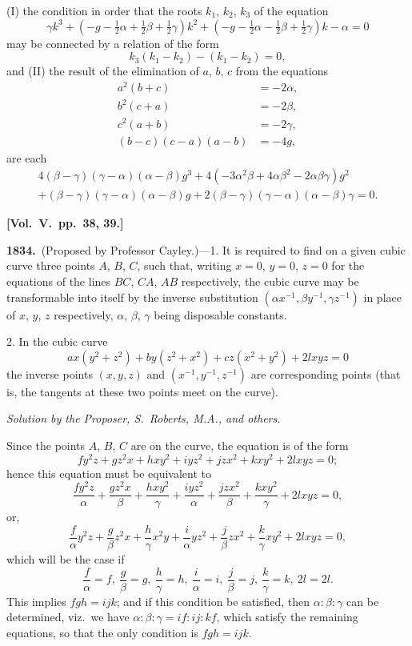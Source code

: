 \documentclass[11pt,a4paper]{article}
\theoremstyle{plain}
\theoremstyle{definition}
\theoremstyle{remark}
\begin{document}
(I) the condition in order that the roots $k_{1}$, $k_{2}$, $k_{3}$ of the equation
\[
\gamma k^{3}+(-g-\tfrac12\alpha+\tfrac12\beta+\tfrac12\gamma)k^{2}+(-g-\tfrac12\alpha-\tfrac12\beta+\tfrac12\gamma)k-\alpha=0 \tag{A}
\]
may be connected by a relation of the form
\[
k_{3}(k_{1}-k_{2})-(k_{1}-k_{2})=0, \tag{1}
\]
and (II) the result of the elimination of $a$, $b$, $c$ from the equations
\begin{align*}
a^{2}(b+c) &= -2\alpha, \tag{2}\\
b^{2}(c+a) &= -2\beta, \tag{3}\\
c^{2}(a+b) &= -2\gamma, \tag{4}\\
(b-c)(c-a)(a-b) &= -4g, \tag{5}
\end{align*}
are each
\begin{multline*}
4(\beta-\gamma)(\gamma-\alpha)(\alpha-\beta)g^{3} + 4(-3\alpha^{2}\beta+4\alpha\beta^{2}-2\alpha\beta\gamma)g^{2}\\
+ (\beta-\gamma)(\gamma-\alpha)(\alpha-\beta)g + 2(\beta-\gamma)(\gamma-\alpha)(\alpha-\beta)\gamma = 0. \tag{B}
\end{multline*}

\textbf{[Vol.\ V.\ pp.\ 38, 39.]}

\textbf{1834.}\ (Proposed by Professor Cayley.)---1. It is required to find on a given cubic curve three points $A$, $B$, $C$, such that, writing $x=0$, $y=0$, $z=0$ for the equations of the lines $BC$, $CA$, $AB$ respectively, the cubic curve may be transformable into itself by the inverse substitution $(\alpha x^{-1},\beta y^{-1},\gamma z^{-1})$ in place of $x$, $y$, $z$ respectively, $\alpha$, $\beta$, $\gamma$ being disposable constants.

2. In the cubic curve
\[
ax(y^{2}+z^{2})+by(z^{2}+x^{2})+cz(x^{2}+y^{2})+2lxyz=0
\]
the inverse points $(x,y,z)$ and $(x^{-1},y^{-1},z^{-1})$ are corresponding points (that is, the tangents at these two points meet on the curve).

\textit{Solution by the Proposer, S.\ Roberts, M.A., and others.}

Since the points $A$, $B$, $C$ are on the curve, the equation is of the form
\[
fy^{2}z+gz^{2}x+hxy^{2}+iyz^{2}+jzx^{2}+kxy^{2}+2lxyz=0;
\]
hence this equation must be equivalent to
\[
\frac{fy^{2}z}{\alpha}+\frac{gz^{2}x}{\beta}+\frac{hxy^{2}}{\gamma}+\frac{iyz^{2}}{\alpha}+\frac{jzx^{2}}{\beta}+\frac{kxy^{2}}{\gamma}+2lxyz=0,
\]
or,
\[
\frac{f}{\alpha}y^{2}z+\frac{g}{\beta}z^{2}x+\frac{h}{\gamma}x^{2}y+\frac{i}{\alpha}yz^{2}+\frac{j}{\beta}zx^{2}+\frac{k}{\gamma}xy^{2}+2lxyz=0,
\]
which will be the case if
\[
\frac{f}{\alpha}=f,\ \frac{g}{\beta}=g,\ \frac{h}{\gamma}=h,\ \frac{i}{\alpha}=i,\ \frac{j}{\beta}=j,\ \frac{k}{\gamma}=k,\ 2l=2l.
\]
This implies $fgh=ijk$; and if this condition be satisfied, then $\alpha:\beta:\gamma$ can be determined, viz.\ we have $\alpha:\beta:\gamma=if:ij:kf$, which satisfy the remaining equations, so that the only condition is $fgh=ijk$.
\end{document}
